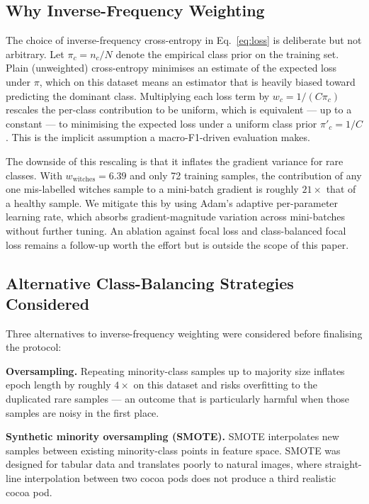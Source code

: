 \documentclass[conference,10pt]{IEEEtran}
\begin{document}
\subsection{Why Inverse-Frequency Weighting}\label{ssec:invfreq}

The choice of inverse-frequency cross-entropy in Eq.~\ref{eq:loss} is
deliberate but not arbitrary. Let $\pi_c = n_c/N$ denote the empirical class
prior on the training set. Plain (unweighted) cross-entropy minimises an
estimate of the expected loss under $\pi$, which on this dataset means an
estimator that is heavily biased toward predicting the dominant class.
Multiplying each loss term by $w_c = 1/(C\pi_c)$ rescales the per-class
contribution to be uniform, which is equivalent — up to a constant — to
minimising the expected loss under a uniform class prior $\pi'_c = 1/C$.
This is the implicit assumption a macro-F1-driven evaluation makes.

The downside of this rescaling is that it inflates the gradient variance for
rare classes. With $w_{\text{witches}}\!=\!6.39$ and only 72 training
samples, the contribution of any one mis-labelled witches sample to a
mini-batch gradient is roughly $21\times$ that of a healthy sample. We
mitigate this by using Adam's adaptive per-parameter learning rate, which
absorbs gradient-magnitude variation across mini-batches without further
tuning. An ablation against focal loss and class-balanced focal loss
remains a follow-up worth the effort but is outside the scope of this paper.

\subsection{Alternative Class-Balancing Strategies Considered}\label{ssec:alt}

Three alternatives to inverse-frequency weighting were considered before
finalising the protocol:

\textbf{Oversampling.} Repeating minority-class samples up to majority size
inflates epoch length by roughly $4\times$ on this dataset and risks
overfitting to the duplicated rare samples — an outcome that is
particularly harmful when those samples are noisy in the first place.

\textbf{Synthetic minority oversampling (SMOTE).} SMOTE interpolates new
samples between existing minority-class points in feature space.
SMOTE was designed for tabular data and translates poorly to natural
images, where straight-line interpolation between two cocoa pods does not
produce a third realistic cocoa pod.
\end{document}
